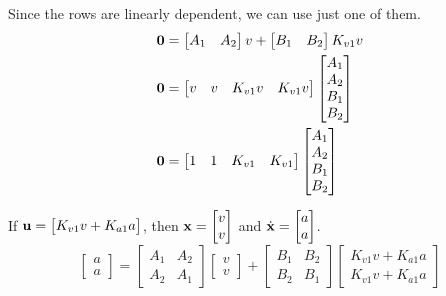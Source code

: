 Since the rows are linearly dependent, we can use just one of them.
\begin{align*}
  \mathbf{0} &=
    \begin{bmatrix}
      A_1 & A_2
    \end{bmatrix} v +
    \begin{bmatrix}
      B_1 & B_2
    \end{bmatrix} K_{v1} v \\
  \mathbf{0} &=
    \begin{bmatrix}
      v & v & K_{v1} v & K_{v1} v
    \end{bmatrix}
    \begin{bmatrix}
      A_1 \\
      A_2 \\
      B_1 \\
      B_2
    \end{bmatrix} \\
  \mathbf{0} &=
    \begin{bmatrix}
      1 & 1 & K_{v1} & K_{v1}
    \end{bmatrix}
    \begin{bmatrix}
      A_1 \\
      A_2 \\
      B_1 \\
      B_2
    \end{bmatrix}
\end{align*}

If $\mathbf{u} =
\begin{bmatrix}
  K_{v1} v + K_{a1} a
\end{bmatrix}$, then $\mathbf{x} =
\begin{bmatrix}
  v \\
  v
\end{bmatrix}$ and $\dot{\mathbf{x}} =
\begin{bmatrix}
  a \\
  a
\end{bmatrix}$.
\begin{equation*}
  \begin{bmatrix}
    a \\
    a
  \end{bmatrix} =
  \begin{bmatrix}
    A_1 & A_2 \\
    A_2 & A_1
  \end{bmatrix}
  \begin{bmatrix}
    v \\
    v
  \end{bmatrix} +
  \begin{bmatrix}
    B_1 & B_2 \\
    B_2 & B_1
  \end{bmatrix}
  \begin{bmatrix}
    K_{v1} v + K_{a1} a \\
    K_{v1} v + K_{a1} a
  \end{bmatrix}
\end{equation*}

